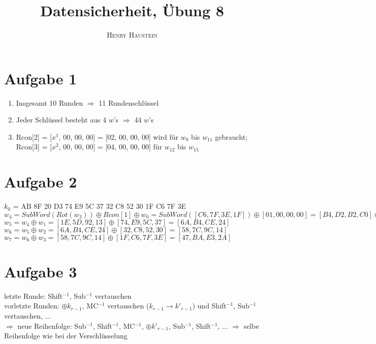 \documentclass{article}
\title{\textbf{Datensicherheit, Übung 8}}
\author{\textsc{Henry Haustein}}
\date{}
\begin{document}
	\maketitle
	
	\section*{Aufgabe 1}
	\begin{enumerate}[label=(\alph*)]
		\item Insgesamt 10 Runden $\Rightarrow$ 11 Rundenschlüssel
		\item Jeder Schlüssel besteht aus 4 $w$'s $\Rightarrow$ 44 $w$'s
		\item Rcon[2] = [$x^1$, 00, 00, 00] = [02, 00, 00, 00] wird für $w_8$ bis $w_{11}$ gebraucht; \\ Rcon[3] = [$x^2$, 00, 00, 00] = [04, 00, 00, 00] für $w_{12}$ bis $w_{15}$
	\end{enumerate}

	\section*{Aufgabe 2}
	$k_0$ = AB 8F 20 D3 74 E9 5C 37 32 C8 52 30 1F C6 7F 3E \\
	$w_4 = SubWord(Rot(w_3)) \oplus Rcon[1] \oplus w_0 = SubWord([C6,7F,3E,1F]) \oplus [01,00,00,00] = [B4, D2, B2, C0] \oplus [01,00,00,00] \oplus [AB, 8F, 20, D3] = [B5, D2, B2, C0] \oplus [AB, 8F, 20, D3] = [1E, 5D, 92, 13]$ \\
	$w_5 = w_4 \oplus w_1 = [1E, 5D, 92, 13] \oplus [74, E9, 5C, 37] = [6A, B4, CE, 24]$ \\
	$w_6 = w_5 \oplus w_2 = [6A, B4, CE, 24] \oplus [32, C8, 52, 30] = [58, 7C, 9C, 14]$ \\
	$w_7 = w_6 \oplus w_3 = [58, 7C, 9C, 14] \oplus [1F, C6, 7F, 3E] = [47, BA, E3, 2A]$
	
	\section*{Aufgabe 3}
	letzte Runde: Shift$^{-1}$, Sub$^{-1}$ vertauschen \\
	vorletzte Runden: $\oplus k_{r-1}$, MC$^{-1}$ vertauschen ($k_{r-1} \to k'_{r-1}$) und Shift$^{-1}$, Sub$^{-1}$ vertauschen, ... \\
	$\Rightarrow$ neue Reihenfolge: Sub$^{-1}$, Shift$^{-1}$, MC$^{-1}$, $\oplus k'_{r-1}$, Sub$^{-1}$, Shift$^{-1}$, ... $\Rightarrow$ selbe Reihenfolge wie bei der Verschlüsselung
	
\end{document}
